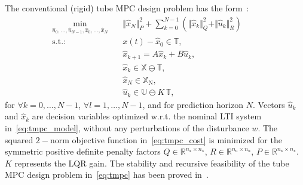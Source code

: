 \documentclass[letterpaper, 10 pt, conference]{ieeeconf}
\begin{document}

	The conventional (rigid) tube MPC design problem has the form~\cite{MS05}:
	\begin{subequations}
		\label{eq:tmpc}
		\begin{eqnarray}
			\label{eq:tmpc_cost}
			\min_{\hat{u}_{0},\ldots,\hat{u}_{N-1}, \hat{x}_{0},\ldots,\hat{x}_{N} } \!\!\!\!\!\!\!\!\!\!\! &\,& \Vert \hat{x}_{N} \Vert_{P}^{2} + \sum_{k=0}^{N-1} \left( \Vert \hat{x}_{k} \Vert_{Q}^{2} + \Vert \hat{u}_{k} \Vert_{R}^{2} \right) \qquad \\
			\label{eq:tmpc_rpi}
			\mathrm{s.t.\!:} &\,& x(t) - \hat{x}_{0} \in \mathbb{T} , \\
			\label{eq:tmpc_model}
			&\,&  \hat{x}_{k+1} = A \hat{x}_{k} + B \hat{u}_{k} , \\
			\label{eq:tmpc_constraints_state}
			&\,& \hat{x}_{k} \in \mathbb{X} \ominus \mathbb{T} , \\
			\label{eq:tmpc_constraints_terminal}
			&\,& \hat{x}_{N} \in \mathbb{X}_{\mathrm{N}}, \\
			\label{eq:tmpc_constraints_input}
			&\,& \hat{u}_{k} \in \mathbb{U} \ominus K \, \mathbb{T} , 
		\end{eqnarray}
	\end{subequations}
	for $\forall k = 0, \dots, N-1$,  $\forall l = 1, \dots, N-1$, and for prediction horizon $N$. Vectors $\hat{u}_{k}$ and $\hat{x}_{k}$ are decision variables optimized w.r.t. the nominal LTI system in~\eqref{eq:tmpc_model}, without any perturbations of the disturbance $w$. 
	The squared $2-$norm objective function in~\eqref{eq:tmpc_cost} is minimized for the symmetric positive definite penalty factors $Q \in \mathbb{R}^{n_{\mathrm{x}} \times n_{\mathrm{x}}}$, $R \in \mathbb{R}^{n_{\mathrm{u}} \times n_{\mathrm{u}}}$, $P \in \mathbb{R}^{n_{\mathrm{x}} \times n_{\mathrm{x}}}$. $K$ represents the LQR gain. 
	The stability and recursive feasibility of the tube MPC design problem in~\eqref{eq:tmpc} has been proved in~\cite{MS05}.
	
\end{document}
